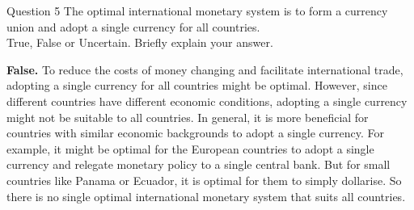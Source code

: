 \documentclass[a4paper]{article}
\newif\IfInSansMode
\numberwithin{equation}{section}
\numberwithin{figure}{section}
\begin{document}
	\begin{questionbox}{Question 5}
		The optimal international monetary system is to form a currency union and adopt a single currency for all countries.\\
		True, False or Uncertain. Briefly explain your answer.
		\begin{explanationbox}
			\textbf{False.} To reduce the costs of money changing and facilitate international trade, adopting a single currency for all countries might be optimal. However, since different countries have different economic conditions, adopting a single currency might not be suitable to all countries. In general, it is more beneficial for countries with similar economic backgrounds to adopt a single currency. For example, it might be optimal for the European countries to adopt a single currency and relegate monetary policy to a single central bank. But for small countries like Panama or Ecuador, it is optimal for them to simply dollarise. So there is no single optimal international monetary system that suits all countries.
		\end{explanationbox}
	\end{questionbox}
\end{document}
